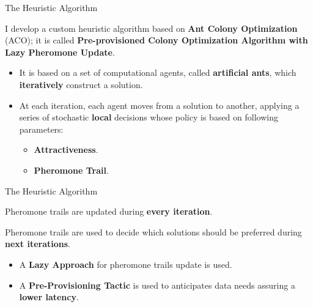 \documentclass[13.5pt]{beamer}
\newcommand{\B}[1]{\textcolor{TorVergataColor}{\textbf{#1}}}
\begin{document}
\begin{frame}{The Heuristic Algorithm}
	
	\begin{block}{}
		\centering
		I develop a custom heuristic algorithm based on \B{Ant Colony Optimization} (ACO); it is called \B{Pre-provisioned Colony Optimization Algorithm with Lazy Pheromone Update}.
	\end{block}
	\vspace{\baselineskip}
	\begin{itemize}
		\item It is based on a set of computational agents, called \B{artificial ants}, which \B{iteratively} construct a solution.
		
		\vspace{\baselineskip}
		
		\item At each iteration, each agent moves from a solution to another, applying a series of stochastic \B{local} decisions whose policy is based on following parameters:
		
		\begin{itemize}
			\item \B{Attractiveness}.
			\item \B{Pheromone Trail}.
		\end{itemize}
		
	\end{itemize}
	
	
	
	
\end{frame}
\begin{frame}{The Heuristic Algorithm}
	
	\begin{block}{}
		\centering
		Pheromone trails are updated during \B{every iteration}.
	\end{block}

	\begin{block}{}
		\centering
		Pheromone trails are used to decide which solutions should be preferred during \B{next iterations}.
	\end{block}

	\vspace{\baselineskip}

	\begin{itemize}
		\item A \B{Lazy Approach} for pheromone trails update is used.
		
		\vspace{\baselineskip}
		
		\item A \B{Pre-Provisioning Tactic} is used to anticipates data needs assuring a \B{lower latency}.
	\end{itemize}



\end{frame}
\end{document}

